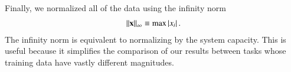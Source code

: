 Finally, we normalized all of the data using the infinity norm
\begin{align}
  \left\lVert\mathbf{x}\right\rVert_\infty \equiv \text{max}\left|x_i\right|.
\end{align}
The infinity norm is equivalent to normalizing by the system capacity. This is
useful because it simplifies the comparison of our results between
tasks whose training data have vastly different magnitudes.

